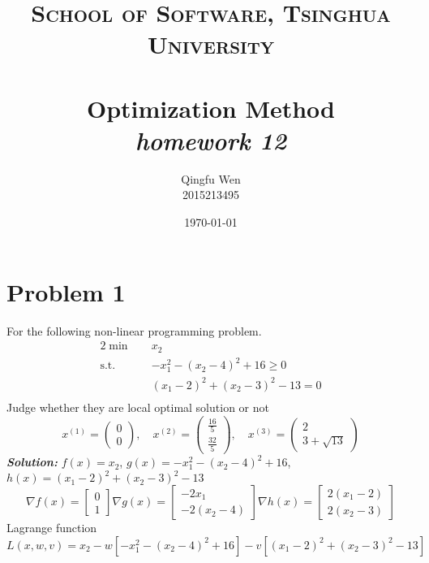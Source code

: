 \documentclass[paper=a4, fontsize=11pt]{scrartcl} %
\title{	
\normalfont \normalsize
\textsc{School of Software, Tsinghua University} \\ [25pt] %
\horrule{0.5pt} \\[0.4cm] %
\huge Optimization Method\\ %
\LARGE\textit{homework 12}
\horrule{2pt} \\[0.5cm] %
}
\author{Qingfu Wen \\ \normalsize 2015213495} %
\date{\normalsize\today} %
\numberwithin{equation}{section} %
\numberwithin{figure}{section} %
\numberwithin{table}{section} %
\begin{document}
\maketitle %
\tableofcontents
\newpage
\section{Problem 1}
For the following non-linear programming problem.
\begin{alignat}{2}          \nonumber
\min\quad & x_2\\    \nonumber
\mbox{s.t.}\quad            \nonumber
& -x_1^2-(x_2-4)^2+16 \geq 0\\        \nonumber
& (x_1-2)^2+(x_2-3)^2-13 = 0\\         \nonumber
\end{alignat}
Judge whether they are local optimal solution or not
\begin{equation}
x^{(1)}=\begin{pmatrix} 0 \\ 0\end{pmatrix}, \quad
x^{(2)}=\begin{pmatrix} \frac{16}{5} \\ \frac{32}{5} \end{pmatrix}, \quad
x^{(3)}=\begin{pmatrix} 2 \\ 3+\sqrt{13}\end{pmatrix} \nonumber
\end{equation}
\emph{\textbf{Solution:}}
$f(x)=x_2$, $g(x)=-x_1^2-(x_2-4)^2+16$, $h(x)=(x_1-2)^2+(x_2-3)^2-13$\\
\begin{equation} \nonumber
\nabla f(x) = \begin{bmatrix}0 \\ 1\end{bmatrix}
\nabla g(x) = \begin{bmatrix}-2x_1 \\ -2(x_2-4)\end{bmatrix}
\nabla h(x) = \begin{bmatrix}2(x_1-2) \\ 2(x_2-3)\end{bmatrix}
\end{equation}
Lagrange function $L(x,w,v)=x_2-w[-x_1^2-(x_2-4)^2+16]-v[(x_1-2)^2+(x_2-3)^2-13]$\\
\end{document}
